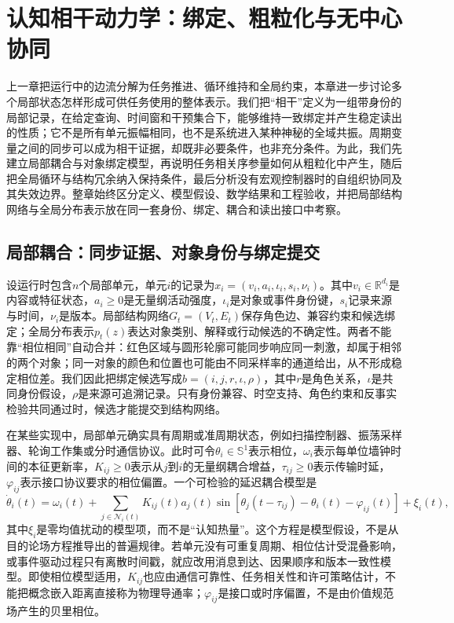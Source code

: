 \chapter{认知相干动力学：绑定、粗粒化与无中心协同}
\label{chp:cognitive_coherence_dynamics}

上一章把运行中的边流分解为任务推进、循环维持和全局约束，本章进一步讨论多个局部状态怎样形成可供任务使用的整体表示。我们把“相干”定义为一组带身份的局部记录，在给定查询、时间窗和干预集合下，能够维持一致绑定并产生稳定读出的性质；它不是所有单元振幅相同，也不是系统进入某种神秘的全域共振。周期变量之间的同步可以成为相干证据，却既非必要条件，也非充分条件。为此，我们先建立局部耦合与对象绑定模型，再说明任务相关序参量如何从粗粒化中产生，随后把全局循环与结构冗余纳入保持条件，最后分析没有宏观控制器时的自组织协同及其失效边界。整章始终区分定义、模型假设、数学结果和工程验收，并把局部结构网络与全局分布表示放在同一套身份、绑定、耦合和读出接口中考察。

\section{局部耦合：同步证据、对象身份与绑定提交}
\label{sec:local_dynamics_phase_locking}

设运行时包含$n$个局部单元，单元$i$的记录为$x_i=(v_i,a_i,\iota_i,s_i,\nu_i)$。其中$v_i\in\mathbb R^{d_i}$是内容或特征状态，$a_i\geq0$是无量纲活动强度，$\iota_i$是对象或事件身份键，$s_i$记录来源与时间，$\nu_i$是版本。局部结构网络$G_t=(V_t,E_t)$保存角色边、兼容约束和候选绑定；全局分布表示$p_t(z)$表达对象类别、解释或行动候选的不确定性。两者不能靠“相位相同”自动合并：红色区域与圆形轮廓可能同步响应同一刺激，却属于相邻的两个对象；同一对象的颜色和位置也可能由不同采样率的通道给出，从不形成稳定相位差。我们因此把绑定候选写成$b=(i,j,r,\iota,\rho)$，其中$r$是角色关系，$\iota$是共同身份假设，$\rho$是来源可追溯记录。只有身份兼容、时空支持、角色约束和反事实检验共同通过时，候选才能提交到结构网络。

在某些实现中，局部单元确实具有周期或准周期状态，例如扫描控制器、振荡采样器、轮询工作集或分时通信协议。此时可令$\theta_i\in\mathbb S^1$表示相位，$\omega_i$表示每单位墙钟时间的本征更新率，$K_{ij}\geq0$表示从$j$到$i$的无量纲耦合增益，$\tau_{ij}\geq0$表示传输时延，$\varphi_{ij}$表示接口协议要求的相位偏置。一个可检验的延迟耦合模型是
\begin{equation}
\dot\theta_i(t)=\omega_i(t)+\sum_{j\in\mathcal N_i(t)}K_{ij}(t)a_j(t)
\sin\!\left[\theta_j(t-\tau_{ij})-\theta_i(t)-\varphi_{ij}(t)\right]+\xi_i(t),
\label{eq:task_conditioned_phase_coupling}
\end{equation}
其中$\xi_i$是零均值扰动的模型项，而不是“认知热量”。这个方程是模型假设，不是从目的论场方程推导出的普遍规律。若单元没有可重复周期、相位估计受混叠影响，或事件驱动过程只有离散时间戳，就应改用消息到达、因果顺序和版本一致性模型。即使相位模型适用，$K_{ij}$也应由通信可靠性、任务相关性和许可策略估计，不能把概念嵌入距离直接称为物理导通率；$\varphi_{ij}$是接口或时序偏置，不是由价值规范场产生的贝里相位。

